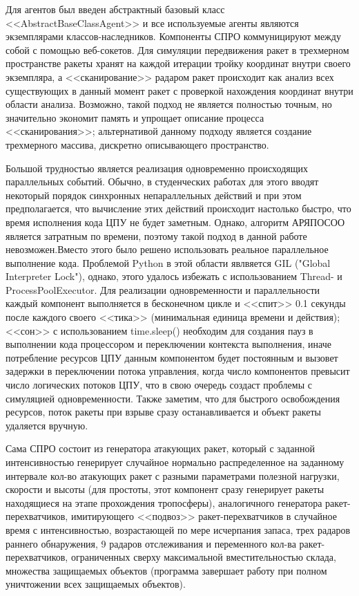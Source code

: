 Для агентов был введен абстрактный базовый класс <<AbstractBaseClassAgent>> и  все используемые агенты являются экземплярами классов-наследников. Компоненты СПРО коммуницируют между собой с помощью веб-сокетов. Для симуляции передвижения ракет в трехмерном пространстве ракеты хранят на каждой итерации тройку координат внутри своего экземпляра, а <<сканирование>> радаром ракет происходит как анализ всех существующих в данный момент ракет с проверкой нахождения координат внутри области анализа. Возможно, такой подход не является полностью точным, но значительно экономит память и упрощает описание процесса <<сканирования>>; альтернативой данному подходу является создание трехмерного массива, дискретно описывающего пространство. 


Большой трудностью является реализация  одновременно происходящих параллельных событий. Обычно, в студенческих работах  для этого вводят некоторый порядок синхронных непараллельных действий и при этом предполагается, что вычисление этих действий происходит настолько быстро, что время исполнения кода ЦПУ не будет заметным. Однако, алгоритм АРЯПОСОО является затратным по времени, поэтому такой подход в данной работе невозможен.Вместо этого было решено использовать реальное параллельное выполнение кода. Проблемой Python в этой области явлвяется GIL ("Global Interpreter Lock"), однако, этого удалось избежать с использованием Thread- и ProcessPoolExecutor. Для реализации одновременности и параллельности каждый компонент выполняется в бесконечном цикле и <<спит>> 0.1 секунды после каждого своего <<тика>> (минимальная единица времени и действия); <<сон>>  с использованием time.sleep() необходим для создания пауз в выполнении кода процессором и переключении контекста выполнения, иначе  потребление ресурсов ЦПУ данным компонентом будет постоянным и вызовет задержки в переключении потока управления, когда число компонентов превысит число логических потоков ЦПУ, что в свою очередь создаст проблемы с симуляцией одновременности. Также заметим, что для быстрого освобождения ресурсов, поток ракеты при взрыве сразу останавливается и объект ракеты удаляется вручную.

Сама СПРО состоит из генератора атакующих ракет, который с заданной интенсивностью генерирует случайное нормально распределенное на заданному интервале кол-во атакующих ракет с разными параметрами полезной нагрузки, скорости и высоты (для простоты, этот компонент сразу генерирует ракеты находящиеся на этапе прохождения тропосферы), аналогичного генератора ракет-перехватчиков, имитирующего <<подвоз>>  ракет-перехватчиков в случайное время с интенсивностью, возрастающей по мере исчерпания запаса, трех радаров раннего обнаружения, 9 радаров отслеживания и переменного кол-ва ракет-перехватчиков, ограниченных сверху максимальной вместительностью склада, множества защищаемых объектов (программа завершает работу при полном уничтожении всех защищаемых объектов).